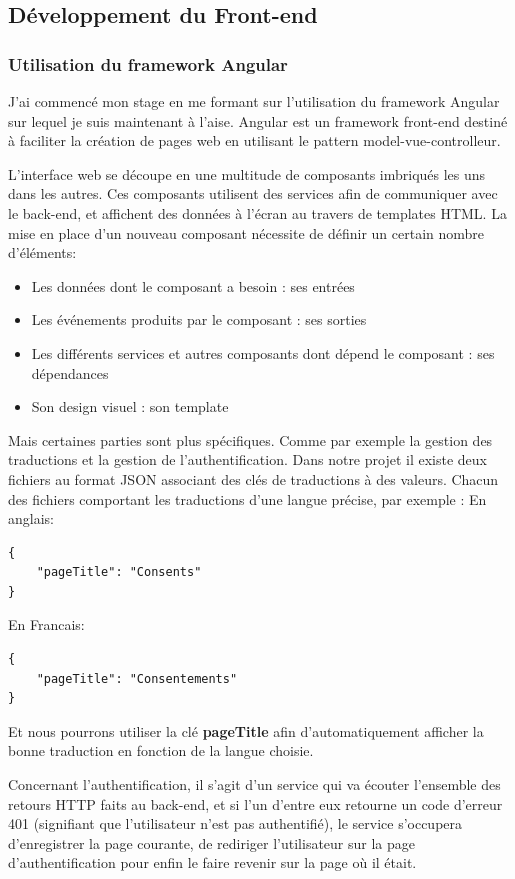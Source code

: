\documentclass[12pt, a4paper]{report}
\newcommand\tab[1][1cm]{\hspace*{#1}}
\begin{document}
\subsection{Développement du Front-end}
\subsubsection{Utilisation du framework Angular}
\tab{}J'ai commencé mon stage en me formant sur l'utilisation du framework Angular sur lequel je suis maintenant à l'aise.\newline
Angular est un framework front-end destiné à faciliter la création de pages web en utilisant le pattern model-vue-controlleur.

L'interface web se découpe en une multitude de composants imbriqués les uns dans les autres.
Ces composants utilisent des services afin de communiquer avec le back-end, et affichent des données à l'écran au travers de templates HTML.
La mise en place d'un nouveau composant nécessite de définir un certain nombre d'éléments:
\begin{itemize}
    \item Les données dont le composant a besoin : ses entrées
    \item Les événements produits par le composant : ses sorties
    \item Les différents services et autres composants dont dépend le composant : ses dépendances
    \item Son design visuel : son template\newline
\end{itemize}
Mais certaines parties sont plus spécifiques. Comme par exemple la gestion des traductions et la gestion de l'authentification.
Dans notre projet il existe deux fichiers au format JSON associant des clés de traductions à des valeurs. Chacun des fichiers comportant les traductions d'une langue précise, par exemple :\newline
En anglais:
\begin{lstlisting}
{
    "pageTitle": "Consents"
}
\end{lstlisting}
En Francais:
\begin{lstlisting}
{
    "pageTitle": "Consentements"
}
\end{lstlisting}
Et nous pourrons utiliser la clé \textbf{pageTitle} afin d'automatiquement afficher la bonne traduction en fonction de la langue choisie.\newline

Concernant l'authentification, il s'agit d'un service qui va écouter l'ensemble des retours HTTP faits au back-end, et si l'un d'entre eux retourne un code d'erreur 401 (signifiant que l'utilisateur n'est pas authentifié), le service s'occupera d'enregistrer la page courante, de rediriger l'utilisateur sur la page d'authentification pour enfin le faire revenir sur la page où il était.\newline
\end{document}
